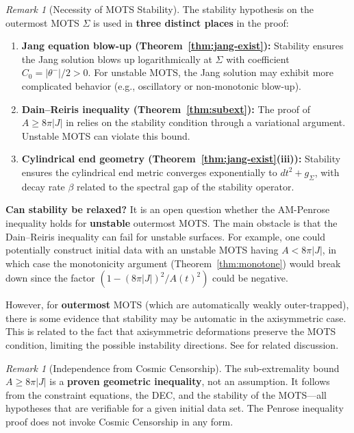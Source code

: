 \documentclass[12pt]{article}
\theoremstyle{plain}
\theoremstyle{definition}
\theoremstyle{remark}
\newtheorem{remark}[theorem]{Remark}
\begin{document}
\begin{remark}[Necessity of MOTS Stability]\label{rem:stability-necessity}
The stability hypothesis on the outermost MOTS $\Sigma$ is used in \textbf{three distinct places} in the proof:

\begin{enumerate}
    \item \textbf{Jang equation blow-up (Theorem~\ref{thm:jang-exist}):} Stability ensures the Jang solution blows up logarithmically at $\Sigma$ with coefficient $C_0 = |\theta^-|/2 > 0$. For unstable MOTS, the Jang solution may exhibit more complicated behavior (e.g., oscillatory or non-monotonic blow-up).
    
    \item \textbf{Dain--Reiris inequality (Theorem~\ref{thm:subext}):} The proof of $A \geq 8\pi|J|$ in \cite{dain2011} relies on the stability condition through a variational argument. Unstable MOTS can violate this bound.
    
    \item \textbf{Cylindrical end geometry (Theorem~\ref{thm:jang-exist}(iii)):} Stability ensures the cylindrical end metric converges exponentially to $dt^2 + g_\Sigma$, with decay rate $\beta$ related to the spectral gap of the stability operator.
\end{enumerate}

\textbf{Can stability be relaxed?} It is an open question whether the AM-Penrose inequality holds for \textbf{unstable} outermost MOTS. The main obstacle is that the Dain--Reiris inequality can fail for unstable surfaces. For example, one could potentially construct initial data with an unstable MOTS having $A < 8\pi|J|$, in which case the monotonicity argument (Theorem~\ref{thm:monotone}) would break down since the factor $(1 - (8\pi|J|)^2/A(t)^2)$ could be negative.

However, for \textbf{outermost} MOTS (which are automatically weakly outer-trapped), there is some evidence that stability may be automatic in the axisymmetric case. This is related to the fact that axisymmetric deformations preserve the MOTS condition, limiting the possible instability directions. See \cite{anderssonmetzger2009} for related discussion.
\end{remark}

\begin{remark}[Independence from Cosmic Censorship]
The sub-extremality bound $A \geq 8\pi|J|$ is a \textbf{proven geometric inequality}, not an assumption. It follows from the constraint equations, the DEC, and the stability of the MOTS---all hypotheses that are verifiable for a given initial data set. The Penrose inequality proof does not invoke Cosmic Censorship in any form.
\end{remark}
\end{document}
